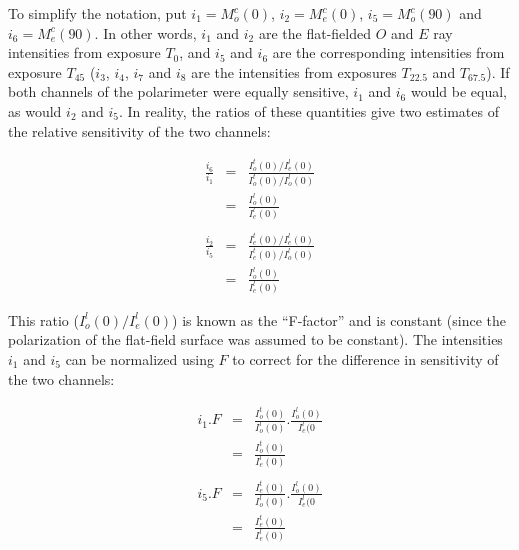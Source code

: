 To simplify the notation, put $i_{1}=M^{c}_{o}(0)$, $i_{2}=M^{c}_{e}(0)$,
$i_{5}=M^{c}_{o}(90)$ and $i_{6}=M^{c}_{e}(90)$. In other words, $i_{1}$ and
$i_{2}$ are the flat-fielded $O$ and $E$ ray intensities from exposure
$T_{0}$, and $i_{5}$ and $i_{6}$ are the corresponding intensities from
exposure $T_{45}$ ($i_{3}$, $i_{4}$, $i_{7}$ and $i_{8}$ are the
intensities from exposures $T_{22.5}$ and $T_{67.5}$). If both channels
of the polarimeter were equally sensitive, $i_{1}$ and $i_{6}$ would be
equal, as would $i_{2}$ and $i_{5}$. In reality, the ratios of these
quantities give two estimates of the relative sensitivity of the two
channels:

\begin{myquote}
\begin{eqnarray*}
  \frac{i_{6}}{i_{1}} & = & \frac{ I^{t}_{o}(0)/I^{l}_{e}(0) } 
                                 { I^{t}_{o}(0)/I^{l}_{o}(0) } \\
                      & = & \frac{ I^{l}_{o}(0) }{ I^{l}_{e}(0) } \\ \\
  \frac{i_{2}}{i_{5}} & = & \frac{ I^{t}_{e}(0)/I^{l}_{e}(0) } 
                                 { I^{t}_{e}(0)/I^{l}_{o}(0) } \\
                      & = & \frac{ I^{l}_{o}(0) }{ I^{l}_{e}(0) } 
\end{eqnarray*}
\end{myquote}

This ratio ($I^{l}_{o}(0)/I^{l}_{e}(0)$) is known as the ``F-factor'' and
is constant (since the polarization of the flat-field surface was assumed
to be constant). The intensities $i_{1}$ and $i_{5}$ can be normalized
using $F$ to correct for the difference in sensitivity of the two channels:

\begin{myquote}
\begin{eqnarray*}
  i_{1}.F & = & \frac{ I^{t}_{o}(0) }{ I^{l}_{o}(0) }.
                \frac{ I^{l}_{o}(0) }{ I^{l}_{e}(0 } \\
          & = & \frac{ I^{t}_{o}(0) }{ I^{l}_{e}(0) } \\ \\
  i_{5}.F & = & \frac{ I^{t}_{e}(0) }{ I^{l}_{o}(0) }.
                \frac{ I^{l}_{o}(0) }{ I^{l}_{e}(0 } \\
          & = & \frac{ I^{t}_{e}(0) }{ I^{l}_{e}(0) } 
\end{eqnarray*}
\end{myquote}

